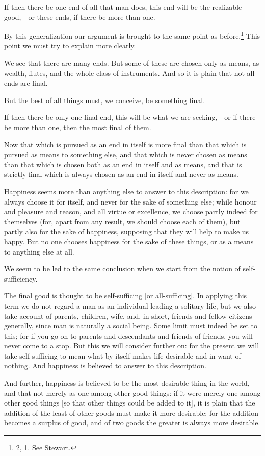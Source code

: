 If then there be one end of all that man does, this end will be the
realizable good,---or these ends, if there be more than one.

By this generalization our argument is brought to the same point as
before.\footnote{2, 1. See Stewart.} This point we must try to explain
more clearly.

We see that there are many ends. But some of these are chosen only as
means, as wealth, flutes, and the whole class of instruments. And so
it is plain that not all ends are final.

But the best of all things must, we conceive, be something final.

If then there be only one final end, this will be what we are
seeking,---or if there be more than one, then the most final of them.

Now that which is pursued as an end in itself is more final than that
which is pursued as means to something else, and that which is never
chosen as means than that which is chosen both as an end in itself and
as means, and that is strictly final which  is always chosen
as an end in itself and never as means.

Happiness seems more than anything else to answer to this description:
for we always choose it for itself, and never for the sake of
something else; while honour and pleasure and reason, and all virtue
or excellence, we choose partly indeed for themselves (for, apart from
any result, we should choose each of them), but partly also for the
sake of happiness, supposing that they will help to make us happy. But
no one chooses happiness for the sake of these things, or as a means
to anything else at all.

We seem to be led to the same conclusion when we start from the notion
of self-sufficiency.

The final good is thought to be self-sufficing [or all-sufficing]. In
applying this term we do not regard a man as an individual leading a
solitary life, but we also take account of parents, children, wife,
and, in short, friends and fellow-citizens generally, since man is
naturally a social being. Some limit must indeed be set to this; for
if you go on to parents and descendants and friends of friends, you
will never come to a stop. But this we will consider further on: for
the present we will take self-sufficing to mean what by itself makes
life desirable and in want of nothing. And happiness is believed to
answer to this description.

And further, happiness is believed to be the most desirable thing in
the world, and that not merely as one among other good things: if it
were merely one among other good things [so that other things could be
added to it], it is plain that the addition of the least  of
other goods must make it more desirable; for the addition becomes a
surplus of good, and of two goods the greater is always more
desirable.

